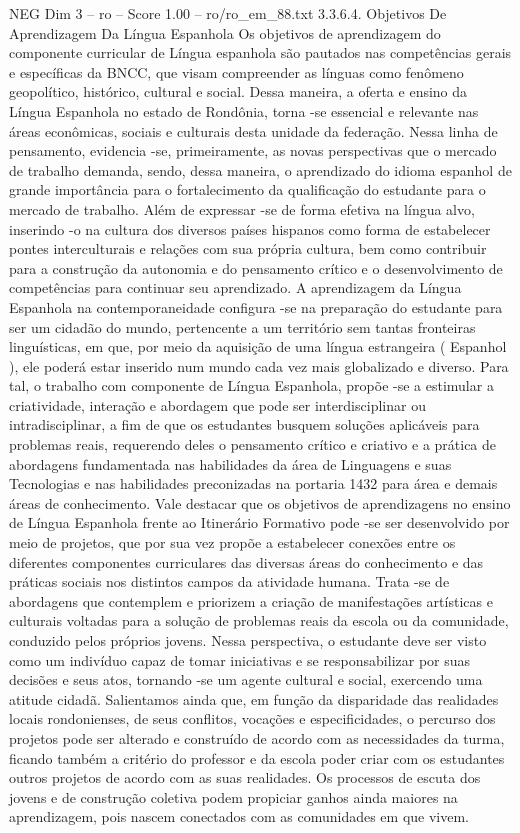 \begin{textsample}{NEG Dim 3 – ro – Score 1.00 – ro/ro\_em\_88.txt}  \label{ex:f3_neg_157}
3.3.6.4.
Objetivos De Aprendizagem Da Língua Espanhola Os objetivos de aprendizagem do componente curricular de Língua espanhola são pautados nas competências gerais e específicas da BNCC, que visam compreender as línguas como fenômeno geopolítico, histórico, cultural e social.
Dessa maneira, a oferta e ensino da Língua Espanhola no estado de Rondônia, torna -se essencial e relevante nas áreas econômicas, sociais e culturais desta unidade da federação.
Nessa linha de pensamento, evidencia -se, primeiramente, as novas perspectivas que o mercado de trabalho demanda, sendo, dessa maneira, o aprendizado do idioma espanhol de grande importância para o fortalecimento da qualificação do estudante para o mercado de trabalho.
Além de expressar -se de forma efetiva na língua alvo, inserindo -o na cultura dos diversos países hispanos como forma de estabelecer pontes interculturais e relações com sua própria cultura, bem como contribuir para a construção da autonomia e do pensamento crítico e o desenvolvimento de competências para continuar seu aprendizado.
A aprendizagem da Língua Espanhola na contemporaneidade configura -se na preparação do estudante para ser um cidadão do mundo, pertencente a um território sem tantas fronteiras linguísticas, em que, por meio da aquisição de uma língua estrangeira ( Espanhol ), ele poderá estar inserido num mundo cada vez mais globalizado e diverso.
Para tal, o trabalho com componente de Língua Espanhola, propõe -se a estimular a criatividade, interação e abordagem que pode ser interdisciplinar ou intradisciplinar, a fim de que os estudantes busquem soluções aplicáveis para problemas reais, requerendo deles o pensamento crítico e criativo e a prática de abordagens fundamentada nas habilidades da área de Linguagens e suas Tecnologias e nas habilidades preconizadas na portaria 1432 para área e demais áreas de conhecimento.
Vale destacar que os objetivos de aprendizagens no ensino de Língua Espanhola frente ao Itinerário Formativo pode -se ser desenvolvido por meio de projetos, que por sua vez propõe a estabelecer conexões entre os diferentes componentes curriculares das diversas áreas do conhecimento e das práticas sociais nos distintos campos da atividade humana.
Trata -se de abordagens que contemplem e priorizem a criação de manifestações artísticas e culturais voltadas para a solução de problemas reais da escola ou da comunidade, conduzido pelos próprios jovens.
Nessa perspectiva, o estudante deve ser visto como um indivíduo capaz de tomar iniciativas e se responsabilizar por suas decisões e seus atos, tornando -se um agente cultural e social, exercendo uma atitude cidadã.
Salientamos ainda que, em função da disparidade das realidades locais rondonienses, de seus conflitos, vocações e especificidades, o percurso dos projetos pode ser alterado e construído de acordo com as necessidades da turma, ficando também a critério do professor e da escola poder criar com os estudantes outros projetos de acordo com as suas realidades.
Os processos de escuta dos jovens e de construção coletiva podem propiciar ganhos ainda maiores na aprendizagem, pois nascem conectados com as comunidades em que vivem.

\end{textsample}
